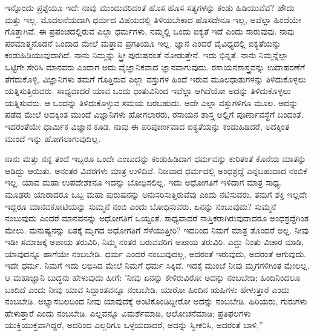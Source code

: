 ಇನ್ನೊಂದು ಪ್ರಶ್ನೆಯೂ ಇದೆ: ನಾವು ಮುಂದುವರಿದಂತೆ ಹೊಸ ಹೊಸ ಸತ್ಯಗಳನ್ನು ಕಂಡು ಹಿಡಿಯುವೆವೆ? ಹೌದು ಮತ್ತು ಇಲ್ಲ. ಮೊದಲನೆಯದಾಗಿ ಧರ್ಮದ ವಿಷಯದಲ್ಲಿ ತಿಳಿಯಬೇಕಾದ ಹೊಸದೇನೂ ಇಲ್ಲ, ಅವೆಲ್ಲಾ ಹಿಂದೆಯೇ ಗೊತ್ತಾಗಿವೆ. ಈ ಪ್ರಪಂಚದಲ್ಲಿರುವ ಎಲ್ಲಾ ಧರ್ಮಗಳು, ನಮ್ಮಲ್ಲಿ ಒಂದು ಐಕ್ಯತೆ ಇದೆ ಎಂದು ಸಾರುವುವು. ನಾವು ಪರಮಾತ್ಮನೊಡನೆ ಒಂದಾದ ಮೇಲೆ ಮತ್ತಾವ ಪ್ರಗತಿಯೂ ಇಲ್ಲ. ಜ್ಞಾನ ಎಂದರೆ ವೈವಿಧ್ಯದಲ್ಲಿ ಐಕ್ಯತೆಯನ್ನು ಕಂಡುಹಿಡಿಯುವುದಾಗಿದೆ. ನಾನು ನಿಮ್ಮನ್ನು ಸ್ತ್ರೀ ಪುರುಷರಂತೆ ನೋಡುತ್ತೇನೆ. ಇದು ಭಿನ್ನತೆ. ನಾನು ನಿಮ್ಮನ್ನೆಲ್ಲಾ ಒಟ್ಟಿಗೇ ಸೇರಿಸಿ ಮಾನವರು ಎಂದಾಗ ಅದು ವೈಜ್ಞಾನಿಕವಾದ ಜ್ಞಾನವಾಗುವುದು. ರಸಾಯನಶಾಸ್ತ್ರವನ್ನು ಉದಾಹರಣೆಗೆ ತೆಗೆದುಕೊಳ್ಳಿ, ವಿಜ್ಞಾನಿಗಳು ತಮಗೆ ಗೊತ್ತಿರುವ ಎಲ್ಲಾ ವಸ್ತುಗಳ ಹಿಂದೆ ಇರುವ ಮೂಲಧಾತುಗಳನ್ನು ತಿಳಿದುಕೊಳ್ಳಲು ಯತ್ನಿಸುತ್ತಿರುವರು. ಸಾಧ್ಯವಾದರೆ ಯಾವ ಒಂದು ಧಾತುವಿನಿಂದ ಇವೆಲ್ಲಾ ಆಗಿದೆಯೋ ಅದನ್ನು ತಿಳಿದುಕೊಳ್ಳಲು ಯತ್ನಿಸುವರು. ಆ ಒಂದನ್ನು ತಿಳಿದುಕೊಳ್ಳುವ ಸಮಯ ಬರಬಹುದು. ಅದೇ ಎಲ್ಲಾ ವಸ್ತುಗಳಿಗೂ ಮೂಲ. ಅದನ್ನು ಪಡೆದ ಮೇಲೆ ಅದಕ್ಕಿಂತ ಮುಂದೆ ವಿಜ್ಞಾನಿಗಳು ಹೋಗಲಾರರು, ರಸಾಯನ ಶಾಸ್ತ್ರ ಅಲ್ಲಿಗೆ ಪೂರ್ಣಾವಸ್ಥೆಗೆ ಬಂದಂತೆ. ಇದರಂತೆಯೇ ಧಾರ್ಮಿಕ ವಿಜ್ಞಾನ ಕೂಡ. ನಾವು ಈ ಪರಿಪೂರ್ಣವಾದ ಐಕ್ಯತೆಯನ್ನು ಕಂಡುಹಿಡಿದರೆ, ಅದಕ್ಕಿಂತ ಮುಂದೆ ಇನ್ನು ಹೋಗಲಾಗುವುದಿಲ್ಲ.

ನಾನು ಮತ್ತು ನನ್ನ ತಂದೆ ಇಬ್ಬರೂ ಒಂದೇ ಎಂಬುದನ್ನು ಕಂಡುಹಿಡಿದಾಗ ಧರ್ಮವನ್ನು ಕುರಿತಂತೆ ಕೊನೆಯ ಮಾತನ್ನು ಆಡಿದ್ದು ಆಯಿತು. ಅನಂತರ ವಿವರಗಳು ಮಾತ್ರ ಉಳಿದಿವೆ. ನಿಜವಾದ ಧರ್ಮದಲ್ಲಿ ಅಂಧಶ್ರದ್ದೆ ಎನ್ನಬಹುದಾದ ನಂಬಿಕೆ ಇಲ್ಲ. ಯಾವ ಮಹಾ ಉಪದೇಶಕನೂ ಇದನ್ನು ಬೋಧಿಸಲಿಲ್ಲ. ಇದು ಅಧೋಗತಿಗೆ ಇಳಿದಾಗ ಮಾತ್ರ ಸಾಧ್ಯ. ಮೂಢರು ಯಾರಾದರೂ ಒಬ್ಬ ಮಹಾ ಪುರುಷನನ್ನು ಅನುಸರಿಸುತ್ತಿರುವೆವು ಎಂದು ನಟಿಸುವರು, ತಮಗೆ ಶಕ್ತಿ ಇಲ್ಲದೇ ಇದ್ದರೂ ಮಾನವಕೋಟಿಯನ್ನು ಸುಮ್ಮನೆ ನಂಬಿ ಎಂದು ಬೋಧಿಸುವರು. ಏನನ್ನು ನಂಬುವುದು? ಸುಮ್ಮನೆ ನಂಬುವುದು ಎಂದರೆ ಮಾನವನನ್ನು ಅಧೋಗತಿಗೆ ಒಯ್ದಂತೆ. ಸಾಧ್ಯವಾದರೆ ನಾಸ್ತಿಕರಾಗಿರುವುದಾದರೂ ಅಂಧಶ್ರದ್ದೆಗಿಂತ ಮೇಲು. ಮನುಷ್ಯನನ್ನು ಏತಕ್ಕೆ ಮೃಗದ ಅಧೋಗತಿಗೆ ಸೆಳೆಯುತ್ತೀರಿ? ಇದರಿಂದ ನಿಮಗೆ ಮಾತ್ರ ತೊಂದರೆ ಅಲ್ಲ. ನೀವು ಇಡೀ ಸಮಾಜಕ್ಕೆ ಅಪಾಯ ತರುವಿರಿ, ನಿಮ್ಮ ನಂತರ ಬರುವವರಿಗೆ ಅಪಾಯ ತರುವಿರಿ. ಎದ್ದು ನಿಂತು ವಿಚಾರ ಮಾಡಿ, ಯಾವುದನ್ನೂ ಹಾಗೆಯೇ ನಂಬಬೇಡಿ. ಧರ್ಮ ಎಂದರೆ ನಂಬುವುದಲ್ಲ, ಅದರಂತೆ ಇರುವುದು, ಅದರಂತೆ ಆಗುವುದು. ಇದೇ ಧರ್ಮ. ನಿಮಗೆ ಇದು ಲಭಿಸಿದ ಮೇಲೆ ನಿಮಗೆ ಧರ್ಮ ಸಿಕ್ಕಿದೆ. ಇದಕ್ಕೆ ಮುಂಚೆ ನೀವು ಮೃಗಗಳಿಗಿಂತ ಮೇಲಲ್ಲ. ಆ ಮಹಾಜ್ಞಾನಿ ಬುದ್ಧನು ಹೇಳುವುದು ಹೀಗೆ: 'ನೀವು ಏನನ್ನು ಕೇಳಿರುವಿರೋ ಅದನ್ನು ನಂಬಬೇಡಿ; ಹಿಂದಿನಿಂದಲೂ ಬಂದಿದೆ ಎಂದು ನೀವು ಯಾವ ಸಿದ್ದಾಂತವನ್ನೂ ನಂಬಬೇಡಿ. ಯಾರೋ ಹಿಂದಿನ ಋಷಿಗಳು ಹೇಳುತ್ತಾರೆ ಎಂದು ನಂಬಬೇಡಿ. ಅಭ್ಯಾಸಬಲದಿಂದ ನೀವು ಯಾವುದಕ್ಕೆ ಅಂಟಿಕೊಂಡಿದ್ದೀರೋ ಅದನ್ನು ನಂಬಬೇಡಿ. ಹಿರಿಯರು, ಗುರುಗಳು ಹೇಳುತ್ತಾರೆ ಎಂದು ನಂಬಬೇಡಿ. ಎಲ್ಲವನ್ನೂ ವಿಮರ್ಶೆಮಾಡಿ, ಆಲೋಚನೆಮಾಡಿ; ಪ್ರತಿಫಲಗಳು ಯುಕ್ತಿಯುಕ್ತವಾಗಿದ್ದರೆ, ಅದರಿಂದ ಎಲ್ಲರಿಗೂ ಒಳ್ಳೆಯದಾದರೆ, ಅದನ್ನು ಸ್ವೀಕರಿಸಿ, ಅದರಂತೆ ಬಾಳಿ,''

